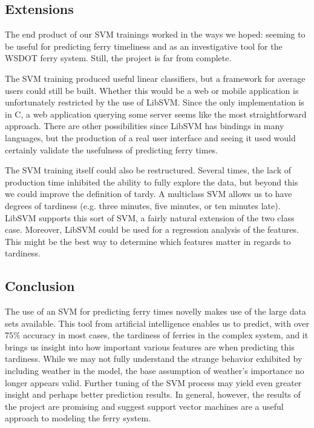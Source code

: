 \documentclass[11pt]{article} %
\begin{document}
\subsection{Extensions}
\label{sec:extensions}
The end product of our SVM trainings worked in the ways we hoped: seeming to be 
useful for predicting ferry timeliness and as an investigative tool for the
WSDOT ferry system. Still, the project is far from complete. 

The SVM training produced useful linear classifiers, but a framework for average
users could still be built. Whether this would be a web or mobile application is
unfortunately restricted by the use of LibSVM. Since the only implementation is in 
C, a web application querying some server seems like the most straightforward
approach. There are other possibilities since LibSVM has bindings in many languages,
but the production of a real user interface and seeing it used would certainly 
validate the usefulness of predicting ferry times.

The SVM training itself could also be restructured. Several times, the lack of
production time inhibited the ability to fully explore the data, but beyond this
we could improve the definition of tardy. A multiclass SVM allows us to have degrees
of tardiness (e.g. three minutes, five minutes, or ten minutes late). LibSVM 
supports this sort of SVM, a fairly natural extension of the two class case.
Moreover, LibSVM could be used for a regression analysis of the features. This might
be the best way to determine which features matter in regards to tardiness. 
 
\subsection{Conclusion}
\label{sec:conclusion}
The use of an SVM for predicting ferry times novelly makes use of the large data 
sets available. This tool from artificial intelligence enables us to predict, with
over $75\%$ accuracy in most cases, the tardiness of ferries in the complex system,
and it brings us insight into how important various features are when predicting
this tardiness. While we may not fully understand the strange behavior exhibited
by including weather in the model, the base assumption of weather's importance no 
longer appears valid. Further tuning of the SVM process may yield even
greater insight and perhaps better prediction results. In general, however, the 
results of the project are promising and suggest support vector machines are
a useful approach to modeling the ferry system.

\newpage 



\end{document}
